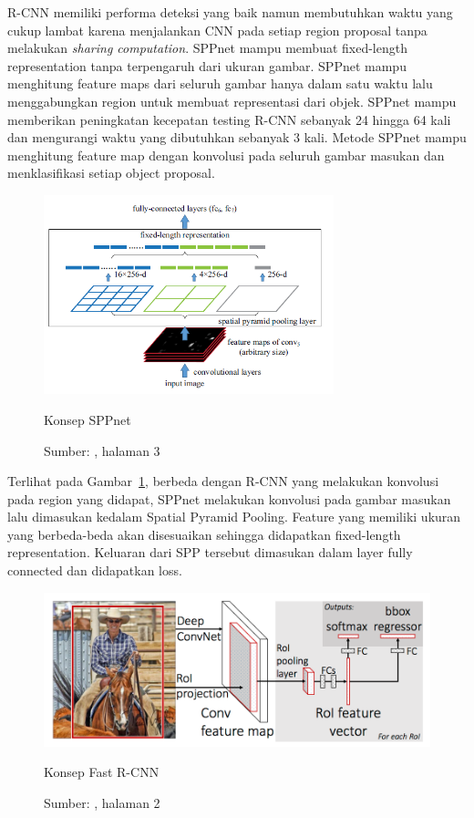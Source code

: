 R-CNN memiliki performa deteksi yang baik namun membutuhkan waktu yang cukup lambat karena menjalankan CNN pada setiap region proposal tanpa melakukan \textit{sharing computation}. SPPnet mampu membuat fixed-length representation tanpa terpengaruh dari ukuran gambar. SPPnet mampu menghitung feature maps dari seluruh gambar hanya dalam satu waktu lalu menggabungkan region untuk membuat representasi dari objek. SPPnet mampu memberikan peningkatan kecepatan testing R-CNN sebanyak 24 hingga 64 kali dan mengurangi waktu yang dibutuhkan sebanyak 3 kali. Metode SPPnet mampu menghitung feature map dengan konvolusi pada seluruh gambar masukan dan menklasifikasi setiap object proposal.

\begin{figure}[ht]
  \centering
  \includegraphics[width=0.75\textwidth]{SPPnet}
  \caption{Konsep SPPnet}
  \caption*{Sumber: \citet{he2014spatial}, halaman 3}
  \label{fig:SPPnet}
\end{figure}

Terlihat pada Gambar~\ref{fig:SPPnet}, berbeda dengan R-CNN yang melakukan konvolusi pada region yang didapat, SPPnet melakukan konvolusi pada gambar masukan lalu dimasukan kedalam Spatial Pyramid Pooling. Feature yang memiliki ukuran yang berbeda-beda akan disesuaikan sehingga didapatkan fixed-length representation. Keluaran dari SPP tersebut dimasukan dalam layer fully connected dan didapatkan loss.

\begin{figure}[ht]
  \includegraphics[width=\textwidth]{fast_rcnn}
  \caption{Konsep Fast R-CNN}
  \caption*{Sumber: \citet{girshick2015fast}, halaman 2}
  \label{fig:fast_rcnn}
\end{figure}

